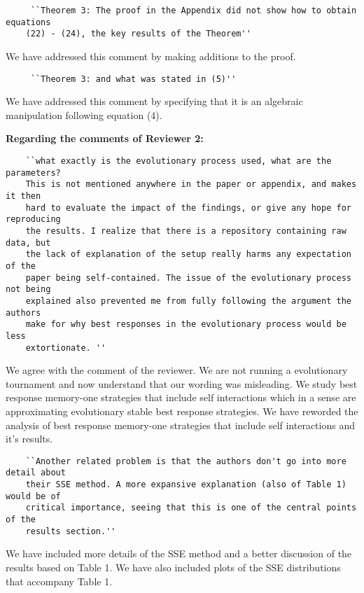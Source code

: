 \documentclass{article}
\begin{document}
\begin{verbatim}
     ``Theorem 3: The proof in the Appendix did not show how to obtain equations
    (22) - (24), the key results of the Theorem''
\end{verbatim}

We have addressed this comment by making additions to the proof.

\begin{verbatim}
     ``Theorem 3: and what was stated in (5)''
\end{verbatim}

We have addressed this comment by specifying that it is an algebraic manipulation
following equation (4).

\textbf{Regarding the comments of Reviewer 2:}

\begin{verbatim}
    ``what exactly is the evolutionary process used, what are the parameters?
    This is not mentioned anywhere in the paper or appendix, and makes it then
    hard to evaluate the impact of the findings, or give any hope for reproducing
    the results. I realize that there is a repository containing raw data, but
    the lack of explanation of the setup really harms any expectation of the
    paper being self-contained. The issue of the evolutionary process not being
    explained also prevented me from fully following the argument the authors
    make for why best responses in the evolutionary process would be less
    extortionate. ''
\end{verbatim}

We agree with the comment of the reviewer. We are not running a evolutionary
tournament and now understand that our wording was misleading. We study best
response memory-one strategies that include self interactions which in a sense are
approximating evolutionary stable best response strategies. We have reworded
the analysis of best response memory-one strategies that include self interactions
and it's results.

\begin{verbatim}
    ``Another related problem is that the authors don't go into more detail about
    their SSE method. A more expansive explanation (also of Table 1) would be of
    critical importance, seeing that this is one of the central points of the
    results section.''
\end{verbatim}

We have included more details of the SSE method and a better
discussion of the results based on Table 1. We have also included plots of the
SSE distributions that accompany Table 1.
\end{document}
